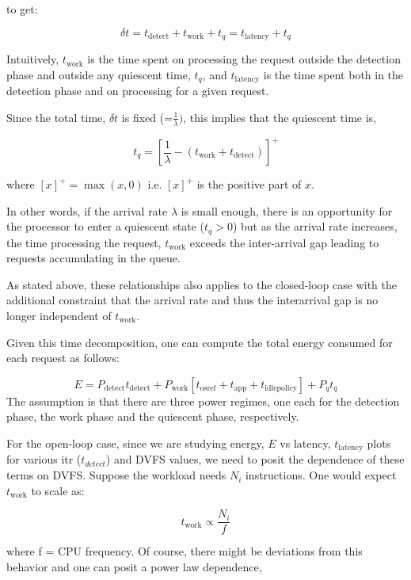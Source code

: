 to get:

$$\delta t = t_{\text{detect}} + t_{\text{work}} + t_q = t_{\text{latency}} + t_q$$

Intuitively, $t_{\text{work}}$ is the time spent on processing the request outside the detection phase and outside any quiescent time, $t_q$, and $t_{\text{latency}}$ is the time spent both in the detection phase and on processing for a given request.

Since the total time, $\delta t$ is fixed (=$\frac{1}{\lambda})$, this implies that the quiescent time is,

$$t_q = \left[\frac{1}{\lambda} - (t_\text{work} + t_{\text{detect}})\right]^+$$

where $[x]^+ = \max(x,0)$ i.e. $[x]^+$ is the positive part of $x$. 

In other words, if the arrival rate $\lambda$ is small enough, there is an opportunity for the processor to enter a quiescent state ($t_q > 0$) but as the arrival rate increases, the time processing the request, $t_\text{work}$ exceeds the inter-arrival gap leading to requests accumulating in the queue. 

As stated above, these relationships also applies to the closed-loop case with the additional constraint that the arrival rate and thus the interarrival gap is no longer independent of $t_\text{work}$.

Given this time decomposition, one can compute the total energy consumed for each request as follows:

\begin{equation}
  E = P_\text{detect} t_{\text{detect}} + P_{\text{work}} \left[t_{\text{osref}} + t_{\text{app}} + t_{\text{idlepolicy}}\right] + P_q t_q 
\label{eq:energy}
\end{equation}
The assumption is that there are three power regimes, one each for the detection phase, the work phase and the quiescent phase, respectively.

For the open-loop case, since we are studying energy, $E$ vs latency, $t_{\text{latency}}$ plots for various itr ($t_{detect}$) and DVFS values, we need to posit the dependence of these terms on DVFS. Suppose the workload needs $N_i$ instructions. One would expect $t_\text{work}$ to scale as:

$$t_{\text{work}} \propto \frac{N_i}{f}$$

where f = CPU frequency. Of course, there might be deviations from this behavior and one can posit a power law dependence,

